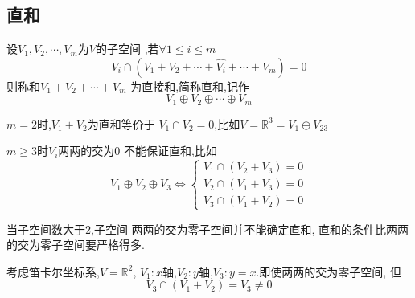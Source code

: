 \subsection{直和}
\begin{formal}
\begin{definition}[直和]\label{def:直和}
    设$V_1,V_2,\cdots,V_m$为$V$的子空间
    ,若$\forall 1
    \leqslant i\leqslant m$
    \[
    V_i \cap \left(
        V_1 + V_2+\cdots +\widehat{V_i}
        +\cdots +V_m
    \right)
     = 0
    \]则称和$V_1 
        +V_2+\cdots +V_m$
        为直接和,简称直和,记作\[
        V_1 \oplus V_2\oplus \cdots
        \oplus V_m
        \]
\end{definition}
\end{formal}
\begin{brown}
\begin{example}
    $m = 2$时,$V_1 + V_2$为直和等价于
    $V_1 \cap V_2 = 0$,比如$V = 
    \mathbb{R}^3 = V_1 \oplus 
    V_{23}$
\end{example}
\end{brown}
\begin{brown}
\begin{example}
    $m \geqslant 3$时$V_i$两两的交为$0$
    不能保证直和,比如
    \[
    V_1\oplus V_2 \oplus V_3
    \Longleftrightarrow
     \begin{cases*}
        V_1 \cap \left(V_2+V_3\right) = 0\\
        V_2 \cap \left(V_1+V_3\right) = 0 \\
        V_3 \cap \left(V_1+V_2\right) = 0
    \end{cases*}
    \]
\end{example}
\end{brown}
\begin{red}
\begin{remark}
    当子空间数大于2,子空间
    两两的交为零子空间并不能确定直和,
    直和的条件比两两的交为零子空间要严格得多.
\end{remark}
\end{red}
\begin{brown}
\begin{example}
    考虑笛卡尔坐标系,$V=\mathbb{R}^2$,
    $V_1:x$轴,$V_2:y$轴,$V_3:y=x$.即使两两的交为零子空间,
    但
    \[
    V_3\cap\left(V_1+V_2\right)=V_3\neq 0
    \]
\end{example}
\end{brown}
